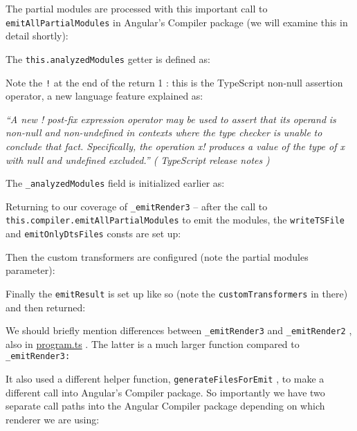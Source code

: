 

The partial modules are processed with this important call to
\texttt{emitAllPartialModules}
in Angular’s Compiler package (we will examine this in detail
shortly):



The
\texttt{this.analyzedModules}
getter is defined as:



Note the
\texttt{!}
at the end of the return
1
: this is the TypeScript non-null assertion
operator, a new language feature explained as:

\emph{“A new ! post-fix expression operator may be used to assert that its operand}
\emph{is non-null and non-undefined in contexts where the type checker is unable}
\emph{to conclude that fact. Specifically, the operation x! produces a value of the}
\emph{type of x with null and undefined excluded.” (}
\emph{TypeScript release notes}
\emph{)}

The
\texttt{\_analyzedModules}
field is initialized earlier as:



Returning to our coverage of
\texttt{\_emitRender3}
– after the call to
\texttt{this.compiler.emitAllPartialModules}
to emit the modules, the
\texttt{writeTSFile}
and
\texttt{emitOnlyDtsFiles}
consts are set up:



Then the custom transformers are configured (note the partial modules parameter):



Finally the
\texttt{emitResult}
is set up like so (note the
\texttt{customTransformers}
in there) and
then returned:



We should briefly mention differences between
\texttt{\_emitRender3}
and
\texttt{\_emitRender2}
, also
in
\url{program.ts}
. The latter is a much larger function compared to
\texttt{\_emitRender3:}



It also used a different helper function,
\texttt{generateFilesForEmit}
, to make a different
call into Angular’s Compiler package. So importantly we have two separate call paths
into the Angular Compiler package depending on which renderer we are using:

